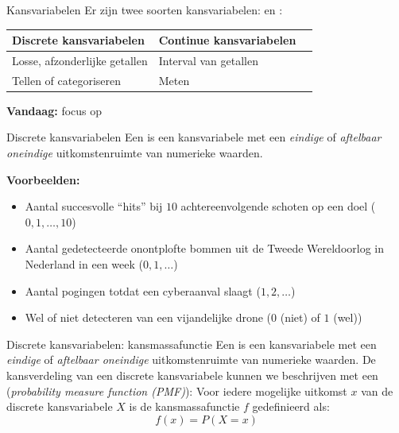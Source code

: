 \begin{frame}{Kansvariabelen}
    Er zijn twee soorten kansvariabelen:  en :
    \vfill
    \begin{center}
        \begin{tabular}{lll}
            \toprule
                \textbf{Discrete kansvariabelen} & \textbf{Continue kansvariabelen} \\
            \midrule
                Losse, afzonderlijke getallen & Interval van getallen \\
                Tellen of categoriseren       & Meten \\
            \bottomrule       
        \end{tabular}
    \end{center}
    \vfill
    \textbf{Vandaag:} focus op 
\end{frame}

\begin{frame}{Discrete kansvariabelen}
    Een  is een kansvariabele met een \emph{eindige} of \emph{aftelbaar oneindige} uitkomstenruimte van numerieke waarden.

    \textbf{Voorbeelden:}
    \begin{itemize}
        \item Aantal succesvolle \enquote{hits} bij $10$ achtereenvolgende schoten op een doel ($0, 1, \ldots, 10$)
        \item Aantal gedetecteerde onontplofte bommen uit de Tweede Wereldoorlog in Nederland in een week ($0, 1, \ldots$)
        \item Aantal pogingen totdat een cyberaanval slaagt ($1, 2, \ldots$)
        \item Wel of niet detecteren van een vijandelijke drone ($0$ (niet) of $1$ (wel))
    \end{itemize}

\end{frame}

\begin{frame}{Discrete kansvariabelen: kansmassafunctie}
    Een  is een kansvariabele met een \emph{eindige} of \emph{aftelbaar oneindige} uitkomstenruimte van numerieke waarden.
    \vfill
    De kansverdeling van een discrete kansvariabele kunnen we beschrijven met een  (\emph{probability measure function (PMF)}):
    \vfill
    Voor iedere mogelijke uitkomst $x$ van de discrete kansvariabele $X$ is de kansmassafunctie $f$ gedefinieerd als:
    \[
        f(x) = P(X = x)
    \]
\end{frame}

